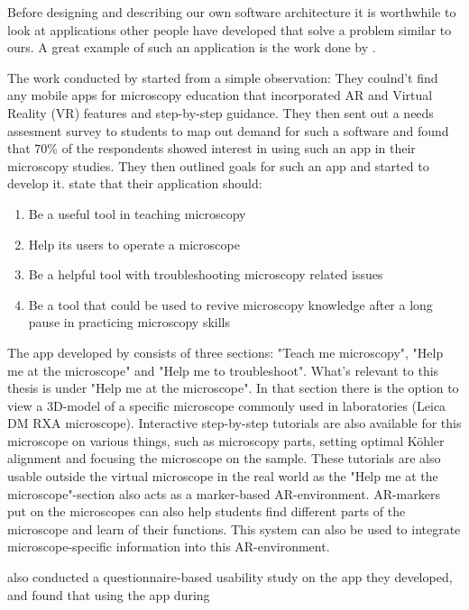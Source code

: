 Before designing and describing our own software architecture it is 
worthwhile to look at applications other people have developed that solve a 
problem similar to ours. A great example of such an application is the work 
done by \textcite{pylvanainen}. \par
	The work conducted by \textcite{pylvanainen} started from a simple
observation: They coulnd't find any mobile apps for microscopy education that 
incorporated AR and Virtual Reality (VR) features and step-by-step guidance. 
They then sent out a needs assesment survey to students to map out demand for 
such a software and found that 70\% of the respondents showed interest in 
using such an app in their microscopy studies.\cite{pylvanainen} They then 
outlined goals for such an app and started to develop it. 
\textcite{pylvanainen} state that their application should:
\begin{enumerate}
	\item Be a useful tool in teaching microscopy
	\item Help its users to operate a microscope
	\item Be a helpful tool with troubleshooting microscopy related issues
	\item Be a tool that could be used to revive microscopy knowledge after a long pause in practicing microscopy skills
\end{enumerate} \par
	The app developed by \textcite{pylvanainen} consists of three 
sections: "Teach me microscopy", "Help me at the microscope" and "Help me to 
troubleshoot". What's relevant to this thesis is under "Help me at the 
microscope". In that section there is the option to view a 3D-model of a 
specific microscope commonly used in laboratories (Leica DM RXA microscope). 
Interactive step-by-step tutorials are also available for this microscope on 
various things, such as microscopy parts, setting optimal Köhler alignment 
and focusing the microscope on the sample. These tutorials are also usable 
outside the virtual microscope in the real world as the "Help me at the 
microscope"-section also acts as a marker-based 
AR-environment.\cite{pylvanainen} AR-markers put on the microscopes can also 
help students find different parts of the microscope and learn of their 
functions. This system can also be used to integrate microscope-specific 
information into this AR-environment.\cite{pylvanainen} \par
	\textcite{pylvanainen} also conducted a questionnaire-based usability 
study on the app they developed, and found that using the app during 
